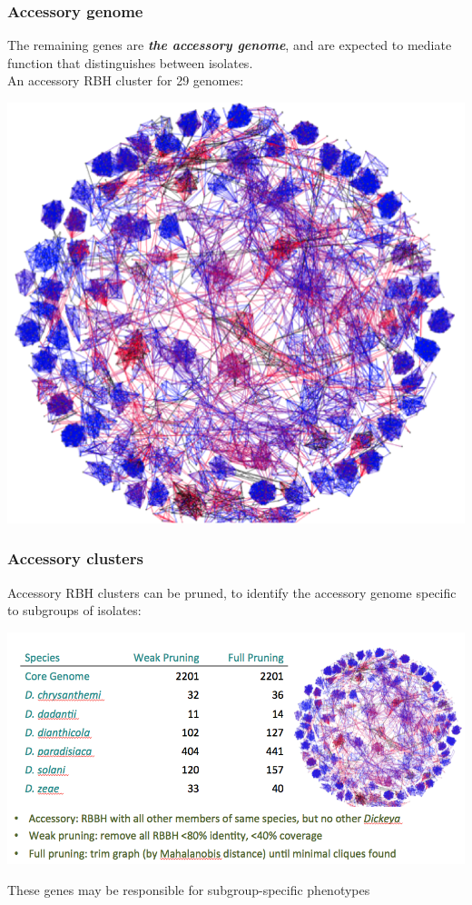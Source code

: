 \begin{frame}
  \frametitle{Accessory genome}
  The remaining genes are \textbf{\textit{the accessory genome}}, and are expected to mediate function that distinguishes between isolates.\\[0.2cm]
  An accessory RBH cluster for 29 genomes:
  \begin{center}
      \includegraphics[height=0.5\textheight]{images/accessory_cluster} 
  \end{center}
\end{frame}

\begin{frame}
  \frametitle{Accessory clusters}
  Accessory RBH clusters can be pruned, to identify the accessory genome specific to subgroups of isolates:
  \begin{center}
      \includegraphics[height=0.55\textheight]{images/dickeya_accessory} 
  \end{center}
  These genes may be responsible for subgroup-specific phenotypes
\end{frame}

